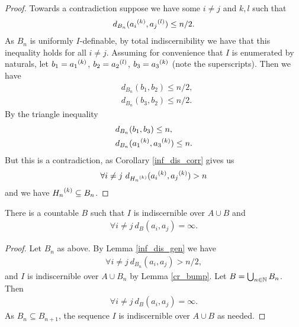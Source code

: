 \begin{proof}
  Towards a contradiction suppose we have some $i \neq j$ and $k, l$ such that
  \begin{align*}
    d_{B_n}({a_i}^{(k)}, {a_j}^{(l)}) \leq n/2.
  \end{align*}
  As $B_n$ is uniformly $I$-definable, by total indiscernibility we have that this inequality holds for all $i \neq j$.
  Assuming for convenience that $I$ is enumerated by naturals, let $b_1 = {a_1}^{(k)}$, $b_2 = {a_2}^{(l)}$, $b_3 = {a_3}^{(k)}$
  (note the superscripts).
  Then we have
  \begin{align*}
    &d_{B_n}(b_1, b_2) \leq n/2, \\
    &d_{B_n}(b_3, b_2) \leq n/2.
  \end{align*}
  By the triangle inequality
  \begin{align*}
    &d_{B_n}(b_1, b_3) \leq n, \\
    &d_{B_n}({a_1}^{(k)}, {a_3}^{(k)}) \leq n.
  \end{align*}
  But this is a contradiction, as Corollary \ref{inf_dis_corr} gives us
  \begin{align*}
    \forall i \neq j \ d_{{H_n}^{(k)}}({a_i}^{(k)}, {a_j}^{(k)}) > n
  \end{align*}
  and we have ${H_n}^{(k)} \subseteq B_n$.
\end{proof}

\begin{Corollary} \label{inf_dis}
  There is a countable $B$ such that $I$ is indiscernible over $A \cup B$ and
  \begin{align*}
    \forall i \neq j \ d_B(a_i, a_j) = \infty.
  \end{align*}
\end{Corollary}

\begin{proof}
  Let $B_n$ as above. By Lemma \ref{inf_dis_gen} we have 
  \begin{align*}
    \forall i \neq j \ d_{B_n}(a_i, a_j) > n/2,
  \end{align*}
  and $I$ is indiscernible over $A \cup B_n$ by Lemma \ref{cr_bump}.
  Let $B = \bigcup_{n \in \mathbb{N}} B_n$.
  Then
  \begin{align*}
    \forall i \neq j \ d_{B}(a_i, a_j) = \infty.
  \end{align*}
  As $B_n \subseteq B_{n+1}$, the sequence $I$ is indiscernible over $A \cup B$ as needed.
\end{proof}

